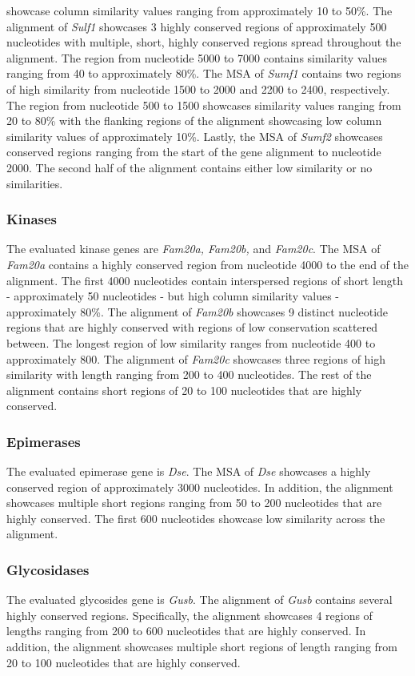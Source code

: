 \documentclass{article}
\begin{document}
showcase column similarity values ranging from approximately 10 to 50\%. The alignment of \textit{Sulf1} showcases 3 highly conserved regions of approximately 500 nucleotides with multiple, short, highly conserved regions spread throughout the alignment. The region from nucleotide 5000 to 7000 contains similarity values ranging from 40 to approximately 80\%. The MSA of \textit{Sumf1} contains two regions of high similarity from nucleotide 1500 to 2000 and 2200 to 2400, respectively. The region from nucleotide 500 to 1500 showcases similarity values ranging from 20 to 80\% with the flanking regions of the alignment showcasing low column similarity values of approximately 10\%. Lastly, the MSA of \textit{Sumf2} showcases conserved regions ranging from the start of the gene alignment to nucleotide 2000. The second half of the alignment contains either low similarity or no similarities. 

\subsubsection*{Kinases}
The evaluated kinase genes are \textit{Fam20a, Fam20b,} and \textit{Fam20c}. The MSA of \textit{Fam20a} contains a highly conserved region from nucleotide 4000 to the end of the alignment. The first 4000 nucleotides contain interspersed regions of short length - approximately 50 nucleotides - but high column similarity values - approximately 80\%. The alignment of \textit{Fam20b} showcases 9 distinct nucleotide regions that are highly conserved with regions of low conservation scattered between. The longest region of low similarity ranges from nucleotide 400 to approximately 800. The alignment of \textit{Fam20c} showcases three regions of high similarity with length ranging from 200 to 400 nucleotides. The rest of the alignment contains short regions of 20 to 100 nucleotides that are highly conserved.

\subsubsection*{Epimerases}
The evaluated epimerase gene is \textit{Dse}. The MSA of \textit{Dse} showcases a highly conserved region of approximately 3000 nucleotides. In addition, the alignment showcases multiple short regions ranging from 50 to 200 nucleotides that are highly conserved. The first 600 nucleotides showcase low similarity across the alignment. 

\subsubsection*{Glycosidases}
The evaluated glycosides gene is \textit{Gusb}. The alignment of \textit{Gusb} contains several highly conserved regions. Specifically, the alignment showcases 4 regions of lengths ranging from 200 to 600 nucleotides that are highly conserved. In addition, the alignment showcases multiple short regions of length ranging from 20 to 100 nucleotides that are highly conserved.
\end{document}
